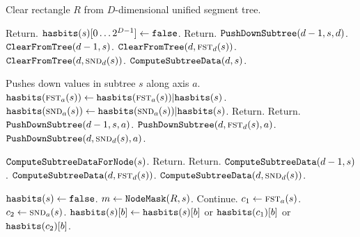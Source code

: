 \documentclass[english,gradu]{tktltiki2018}
\begin{document}
\begin{alg}\label{alg:segurm}
Clear rectangle $R$ from $D$-dimensional unified segment tree.
\begin{algorithmic}
		\State Return.
	\EndIf
		\State $\texttt{hasbits}(s)[0\dots 2^{D-1}]\gets\texttt{false}$.
		\State Return.
	\EndIf
		\State $\texttt{PushDownSubtree}(d-1,s,d)$.
	\EndIf
	\State $\texttt{ClearFromTree}(d-1,s)$.
		\State $\texttt{ClearFromTree}(d,\textsc{fst}_{d}(s))$.
		\State $\texttt{ClearFromTree}(d,\textsc{snd}_{d}(s))$.
	\EndIf
		\State $\texttt{ComputeSubtreeData}(d,s)$.
	\EndIf
\EndProcedure

	\Comment Pushes down values in subtree $s$ along axis $a$.
		\State $\texttt{hasbits}(\textsc{fst}_{a}(s))\gets \texttt{hasbits}(\textsc{fst}_{a}(s)) | \texttt{hasbits}(s)$.
		\State $\texttt{hasbits}(\textsc{snd}_{a}(s))\gets \texttt{hasbits}(\textsc{snd}_{a}(s)) | \texttt{hasbits}(s)$.
		\State Return.
		\State Return.
	\EndIf
	\State $\texttt{PushDownSubtree}(d-1,s,a)$.
		\State $\texttt{PushDownSubtree}(d,\textsc{fst}_{d}(s),a)$.
		\State $\texttt{PushDownSubtree}(d,\textsc{snd}_{d}(s),a)$.
	\EndIf
\EndProcedure

		\State $\texttt{ComputeSubtreeDataForNode}(s)$.
		\State Return.
		\State Return.
	\EndIf
	\State $\texttt{ComputeSubtreeData}(d-1,s)$.
		\State $\texttt{ComputeSubtreeData}(d,\textsc{fst}_{d}(s))$.
		\State $\texttt{ComputeSubtreeData}(d,\textsc{snd}_{d}(s))$.
	\EndIf
\EndProcedure

	\State $\texttt{hasbits}(s)\gets\texttt{false}$.
	\State $m\gets\texttt{NodeMask}(R,s)$.
			\State Continue.
		\EndIf
		\State $c_1\gets\textsc{fst}_{a}(s)$.
		\State $c_2\gets\textsc{snd}_{a}(s)$.
				\State $\texttt{hasbits}(s)[b]\gets \texttt{hasbits}(s)[b]$ or $\texttt{hasbits}(c_1)[b]$ or $\texttt{hasbits}(c_2)[b]$.
			\EndIf
		\EndFor
	\EndFor
\EndProcedure
\end{algorithmic}
\end{alg}
\end{document}
